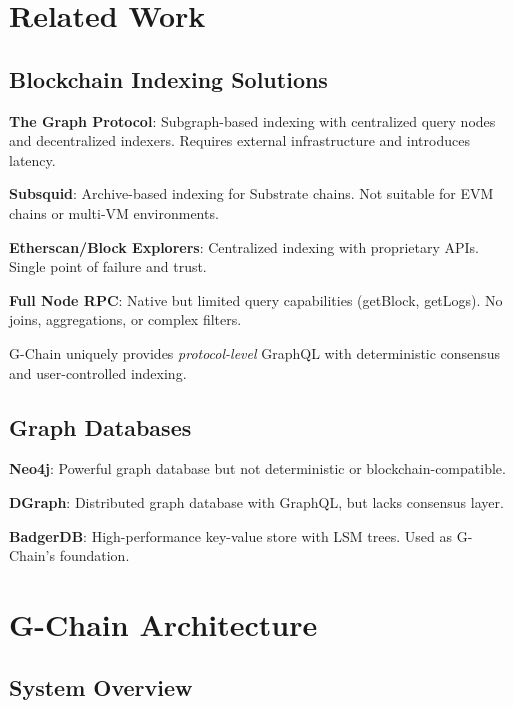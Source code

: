 \documentclass[11pt,a4paper]{article}
\begin{document}
\section{Related Work}

\subsection{Blockchain Indexing Solutions}

\textbf{The Graph Protocol}: Subgraph-based indexing with centralized query nodes and decentralized indexers. Requires external infrastructure and introduces latency.

\textbf{Subsquid}: Archive-based indexing for Substrate chains. Not suitable for EVM chains or multi-VM environments.

\textbf{Etherscan/Block Explorers}: Centralized indexing with proprietary APIs. Single point of failure and trust.

\textbf{Full Node RPC}: Native but limited query capabilities (getBlock, getLogs). No joins, aggregations, or complex filters.

G-Chain uniquely provides \textit{protocol-level} GraphQL with deterministic consensus and user-controlled indexing.

\subsection{Graph Databases}

\textbf{Neo4j}: Powerful graph database but not deterministic or blockchain-compatible.

\textbf{DGraph}: Distributed graph database with GraphQL, but lacks consensus layer.

\textbf{BadgerDB}: High-performance key-value store with LSM trees. Used as G-Chain's foundation.

\section{G-Chain Architecture}

\subsection{System Overview}
\end{document}
